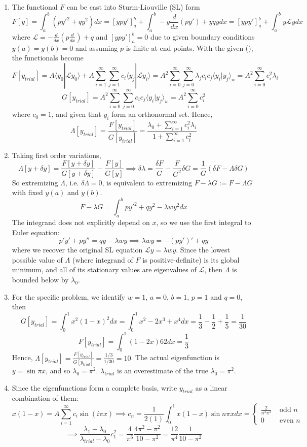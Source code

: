 \documentclass[a4paper]{article}
\begin{document}
\begin{ans}\leavevmode
\begin{enumerate}[label=(\alph*)]
\item The functional $F$ can be cast into Sturm-Liouville (SL) form 
$$F[y]=\int_a^b(py'^2+qy^2)dx=[ypy']_a^b+\int_a^b-y\frac{d}{dx}(py')+yqydx=[ypy']_a^b+\int_a^b y\mathcal{L}ydx$$
where $\mathcal{L}=-\frac{d}{dx}(p\frac{d}{dx})+q$ and $[ypy']_a^b=0$ due to given boundary conditions $y(a)=y(b)=0$ and assuming $p$ is finite at end points. With the given (\dag), the functionals become
$$F[y_{trial}]=A\langle y_0|\mathcal{L}y_0\rangle+A\sum_{i=1}^\infty\sum_{j=1}
^\infty c_i\langle y_j|\mathcal{L}y_i\rangle=A^2\sum_{i=0}^\infty\sum_{j=0}^\infty\lambda_jc_ic_j\langle y_i|y_j\rangle_w=A^2\sum_{i=0}^\infty c_i^2\lambda_i$$
$$G[y_{trial}]=A^2\sum_{i=0}^\infty\sum_{j=0}^\infty c_ic_j\langle y_i|y_j\rangle_w=A^2\sum_{i=0}^\infty c_i^2$$
where $c_0=1$, and given that $y_i$ form an orthonormal set. Hence,
$$\Lambda[y_{trial}]=\frac{F[y_{trial}]}{G[y_{trial}]}=\frac{\lambda_0+\sum_{i=1}^\infty c_i^2\lambda_i}{1+\sum_{i=1}^\infty c_i^2}$$
\item Taking first order variations,
$$\Lambda[y+\delta y]=\frac{F[y+\delta y]}{G[y+\delta y]}-\frac{F[y]}{G[y]}\implies \delta\lambda=\frac{\delta F}{G}-\frac{F}{G^2}\delta G
=\frac{1}{G}(\delta F-\Lambda\delta G)$$
So extremizing $\Lambda$, i.e. $\delta\Lambda=0$, is equivalent to extremizing $F-\lambda G:=F-\Lambda G$ with fixed $y(a)$ and $y(b)$.
$$F-\lambda G=\int_a^bpy'^2+qy^2-\lambda wy^2dx$$
The integrand does not explicitly depend on $x$, so we use the first integral to Euler equation:
$$p'y'+py''=qy-\lambda wy\implies \lambda wy=-(py')'+qy$$
where we recover the original SL equation $\mathcal{L}y=\lambda wy$. Since the lowest possible value of $\Lambda$ (where integrand of $F$ is positive-definite) is its global minimum, and all of its stationary values are eigenvalues of $\mathcal{L}$, then $\Lambda$ is bounded below by $\lambda_0$.
\item For the specific problem, we identify $w=1$, $a=0$, $b=1$, $p=1$ and $q=0$, then
$$G[y_{trial}]=\int_0^1x^2(1-x)^2dx=\int_0^1x^2-2x^3+x^4dx=\frac{1}{3}-\frac{1}{2}+\frac{1}{5}=\frac{1}{30}$$
$$F[y_{trial}]=\int_0^1(1-2x)62dx=\frac{1}{3}$$
Hence, $\Lambda[y_{trial}]=\frac{F[y_{trial}]}{G[y_{trial}]}=\frac{1/3}{1/30}=10$. The actual eigenfunction is $y=\sin\pi x$, and so $\lambda_0=\pi^2$. $\lambda_{trial}$ is an overestimate of the true $\lambda_0=\pi^2$.
\item Since the eigenfunctions form a complete basis, write $y_{trial}$ as a linear combination of them:
$$x(1-x)=A\sum_{i=1}^\infty c_i\sin(i\pi x)\implies c_n=\frac{1}{2(1)}\int_0^1x(1-x)\sin n\pi xdx=\left\{
        \begin{array}{ll}
      \frac{2}{n^3\pi^3} & \text{ odd }n \\
      0 & \text{ even } n
        \end{array}
    \right.$$
$$\implies\frac{\lambda_1-\lambda_0}{\lambda_{trial}-\lambda_0}c_1^2=\frac{4}{\pi^6}\frac{4\pi^2-\pi^2}{10-\pi^2}=\frac{12}{\pi^4}\frac{1}{10-\pi^2}$$
\end{enumerate}
\end{ans}
\newpage
\end{document}
